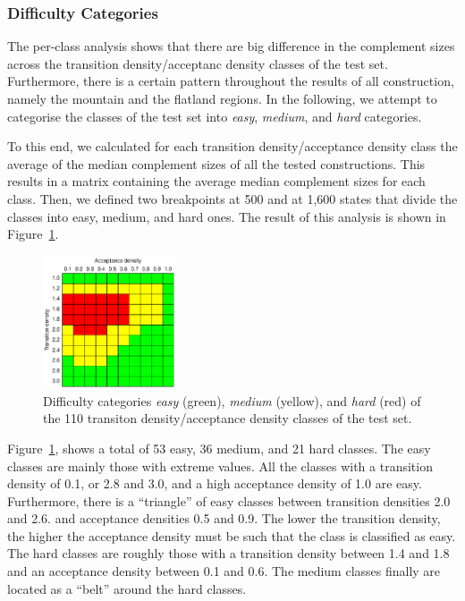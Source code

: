 \subsubsection{Difficulty Categories}
The per-class analysis shows that there are big difference in the complement sizes across the transition density/acceptanc density classes of the \goal{} test set. Furthermore, there is a certain pattern throughout the results of all construction, namely the mountain and the flatland regions. In the following, we attempt to categorise the classes of the \goal{} test set into \textit{easy}, \textit{medium}, and \textit{hard} categories. 

To this end, we calculated for each transition density/acceptance density class the average of the median complement sizes of all the tested constructions. This results in a matrix containing the average median complement sizes for each class. Then, we defined two breakpoints at 500 and at 1,600 states that divide the classes into easy, medium, and hard ones. The result of this analysis is shown in Figure~\ref{i.g.difficulty}.

\begin{figure}[ht]
\centering
\includegraphics[width=0.35\textwidth]{figures/r/internal/goal/difficulty.pdf}
\caption{Difficulty categories \textit{easy} (green), \textit{medium} (yellow), and \textit{hard} (red) of the 110 transiton density/acceptance density classes of the \goal{} test set.}
\label{i.g.difficulty}
\end{figure}

Figure~\ref{i.g.difficulty}, shows a total of  53 easy, 36 medium, and 21 hard classes. The easy classes are mainly those with extreme values. All the classes with a transition density of 0.1, or 2.8 and 3.0, and a high acceptance density of 1.0 are easy. Furthermore, there is a ``triangle'' of easy classes between transition densities 2.0 and 2.6. and acceptance densities 0.5 and 0.9. The lower the transition density, the higher the acceptance density must be such that the class is classified as easy. The hard classes are roughly those with a transition density between 1.4 and 1.8 and an acceptance density between 0.1 and 0.6. The medium classes finally are located as a ``belt'' around the hard classes.

